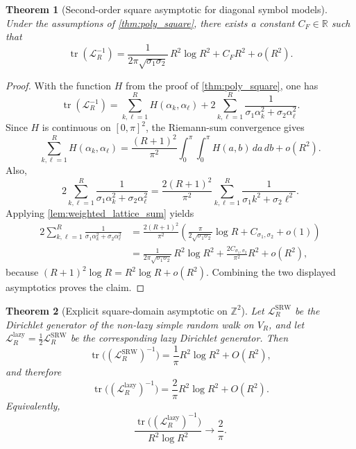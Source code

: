 \documentclass[reqno]{amsart}
\numberwithin{equation}{section}
\newtheorem{theorem}{Theorem}[section]
\theoremstyle{definition}
\theoremstyle{remark}
\newcommand{\Cref}[1]{\autoref{#1}}
\DeclareMathOperator{\tr}{tr}
\begin{document}
\begin{theorem}[Second-order square asymptotic for diagonal symbol models]\label{thm:poly_square_second}
Under the assumptions of \Cref{thm:poly_square}, there exists a constant $C_F\in\mathbb R$ such that
\[
  \tr(\mathcal L_R^{-1})
  =
  \frac{1}{2\pi\sqrt{\sigma_1\sigma_2}}\,R^2\log R^2
  +
  C_F R^2
  + o(R^2).
\]
\end{theorem}

\begin{proof}
With the function $H$ from the proof of \Cref{thm:poly_square}, one has
\[
  \tr(\mathcal L_R^{-1})
  =
  \sum_{k,\ell=1}^R H(\alpha_k,\alpha_\ell)
  +
  2\sum_{k,\ell=1}^R\frac{1}{\sigma_1\alpha_k^2+\sigma_2\alpha_\ell^2}.
\]
Since $H$ is continuous on $[0,\pi]^2$, the Riemann-sum convergence gives
\[
  \sum_{k,\ell=1}^R H(\alpha_k,\alpha_\ell)
  =
  \frac{(R+1)^2}{\pi^2}\int_0^\pi\!\!\int_0^\pi H(a,b)\,da\,db
  + o(R^2).
\]
Also,
\[
  2\sum_{k,\ell=1}^R\frac{1}{\sigma_1\alpha_k^2+\sigma_2\alpha_\ell^2}
  =
  \frac{2(R+1)^2}{\pi^2}
  \sum_{k,\ell=1}^R \frac{1}{\sigma_1 k^2+\sigma_2\ell^2}.
\]
Applying \Cref{lem:weighted_lattice_sum} yields
\begin{align*}
  2\sum_{k,\ell=1}^R\frac{1}{\sigma_1\alpha_k^2+\sigma_2\alpha_\ell^2}
  &=
  \frac{2(R+1)^2}{\pi^2}
  \left(
    \frac{\pi}{2\sqrt{\sigma_1\sigma_2}}\log R
    +
    C_{\sigma_1,\sigma_2}
    + o(1)
  \right) \\
  &=
  \frac{1}{2\pi\sqrt{\sigma_1\sigma_2}}\,R^2\log R^2
  +
  \frac{2C_{\sigma_1,\sigma_2}}{\pi^2}R^2
  + o(R^2),
\end{align*}
because $(R+1)^2\log R = R^2\log R + o(R^2)$. Combining the two displayed asymptotics proves the claim.
\end{proof}

\begin{theorem}[Explicit square-domain asymptotic on $\mathbb Z^2$]\label{thm:Z2_square}
Let $\mathcal{L}_{R}^{\mathrm{SRW}}$ be the Dirichlet generator of the non-lazy simple random walk on $V_R$, and let $\mathcal{L}_{R}^{\mathrm{lazy}}=\frac12 \mathcal{L}_{R}^{\mathrm{SRW}}$ be the corresponding lazy Dirichlet generator. Then
\[
\tr\!\bigl((\mathcal{L}_{R}^{\mathrm{SRW}})^{-1}\bigr)
=\frac{1}{\pi}R^2\log R^2+O(R^2),
\]
and therefore
\[
\tr\!\bigl((\mathcal{L}_{R}^{\mathrm{lazy}})^{-1}\bigr)
=\frac{2}{\pi}R^2\log R^2+O(R^2).
\]
Equivalently,
\[
\frac{\tr\!\bigl((\mathcal{L}_{R}^{\mathrm{lazy}})^{-1}\bigr)}{R^2\log R^2}\longrightarrow \frac{2}{\pi}.
\]
\end{theorem}
\end{document}
